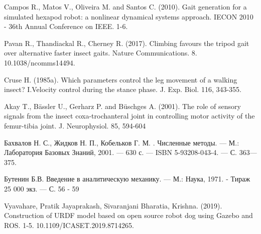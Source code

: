 \documentclass{article}
\begin{document}
\clearpage
\begin{thebibliography}{9}
Campos R., Matos V., Oliveira M. and Santos C. (2010). Gait generation for a simulated hexapod robot: a nonlinear dynamical systems approach. IECON 2010 - 36th Annual Conference on IEEE. 1-6.

Pavan R., Thandiackal R., Cherney R. (2017). Climbing favours the tripod gait over alternative faster insect gaits. Nature Communications. 8. 10.1038/ncomms14494. 

Cruse H. (1985a). Which parameters control the leg movement of a walking insect? I.Velocity control during the stance phase. J. Exp. Biol. 116, 343-355.

Akay T., Bässler U., Gerharz P. and Büschges A. (2001). The role of sensory signals from the insect coxa-trochanteral joint in controlling motor activity of the femur-tibia joint. J. Neurophysiol. 85, 594-604

Бахвалов Н. С., Жидков Н. П., Кобельков Г. М. . Численные методы. — М.: Лаборатория Базовых Знаний, 2001. — 630 с. — ISBN 5-93208-043-4. — С. 363—375.

Бутенин Б.В. Введение в аналитическую механику. — М.: Наука, 1971. - Тираж 25 000 экз. — С. 56 - 59

Vyavahare, Pratik Jayaprakash, Sivaranjani Bharatia, Krishna. (2019). Construction of URDF model based on open source robot dog using Gazebo and ROS. 1-5. 10.1109/ICASET.2019.8714265. 

\end{thebibliography}
\end{document}

